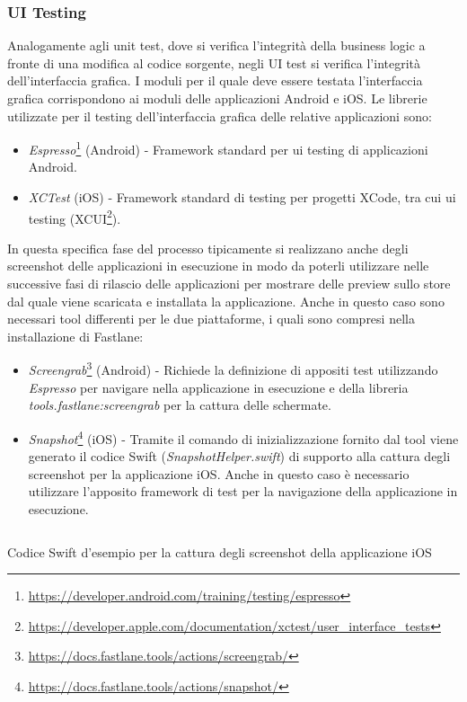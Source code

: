 \subsubsection{UI Testing}
Analogamente agli unit test, dove si verifica l'integrità della business logic a fronte di una modifica al codice sorgente, negli UI test si verifica l'integrità dell'interfaccia grafica. I moduli per il quale deve essere testata l'interfaccia grafica corrispondono ai moduli delle applicazioni Android e iOS. Le librerie utilizzate per il testing dell'interfaccia grafica delle relative applicazioni sono:
\begin{itemize}
    \item \textit{Espresso}\footnote{\url{https://developer.android.com/training/testing/espresso}} (Android) - Framework standard per ui testing di applicazioni Android.
    \item \textit{XCTest} (iOS) - Framework standard di testing per progetti XCode, tra cui ui testing (XCUI\footnote{\url{https://developer.apple.com/documentation/xctest/user_interface_tests}}).
\end{itemize}
In questa specifica fase del processo tipicamente si realizzano anche degli screenshot delle applicazioni in esecuzione in modo da poterli utilizzare nelle successive fasi di rilascio delle applicazioni per mostrare delle preview sullo store dal quale viene scaricata e installata la applicazione. Anche in questo caso sono necessari tool differenti per le due piattaforme, i quali sono compresi nella installazione di Fastlane:
\begin{itemize}
    \item \textit{Screengrab}\footnote{\url{https://docs.fastlane.tools/actions/screengrab/}} (Android) - Richiede la definizione di appositi test utilizzando \textit{Espresso} per navigare nella applicazione in esecuzione e della libreria \textit{tools.fastlane:screengrab} per la cattura delle schermate.
    \item \textit{Snapshot}\footnote{\url{https://docs.fastlane.tools/actions/snapshot/}} (iOS) - Tramite il comando di inizializzazione fornito dal tool viene generato il codice Swift (\textit{SnapshotHelper.swift}) di supporto alla cattura degli screenshot per la applicazione iOS. Anche in questo caso è necessario utilizzare l'apposito framework di test per la navigazione della applicazione in esecuzione.
\end{itemize}

\begin{listing}[H]
\inputminted{swift}{code/4-ios-screenshot}
\caption{Codice Swift d'esempio per la cattura degli screenshot della applicazione iOS}
\end{listing}

